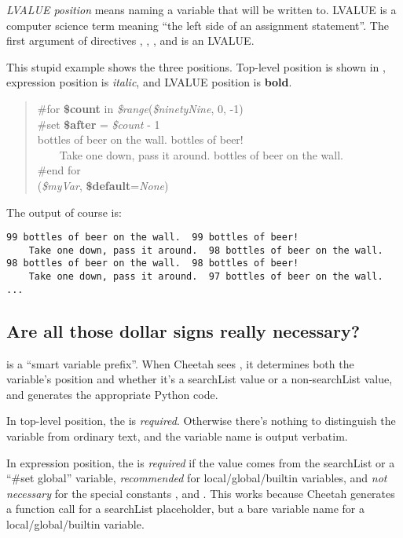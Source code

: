 {\em LVALUE position} means naming a variable that will be written to.  LVALUE
is a computer science term meaning ``the left side of an assignment 
statement''.  The first argument of directives , ,
,  and  is an LVALUE.

This stupid example shows the three positions.  Top-level position is shown
in , expression position is {\em italic}, and LVALUE position is
{\bf bold}.

\begin{quote}
\#for {\bf \$count} in {\em \$range}({\em \$ninetyNine}, 0, -1)\\
\#set {\bf \$after} = {\em \$count} - 1\\
 bottles of beer on the wall.   bottles of beer!\\
~~~~Take one down, pass it around.   bottles of beer on the wall.\\
\#end for\\
({\em \$myVar}, {\bf \$default}={\em None})
\end{quote}

The output of course is:
\begin{verbatim}
99 bottles of beer on the wall.  99 bottles of beer!
    Take one down, pass it around.  98 bottles of beer on the wall.
98 bottles of beer on the wall.  98 bottles of beer!
    Take one down, pass it around.  97 bottles of beer on the wall.
...
\end{verbatim}


\subsection{Are all those dollar signs really necessary?}
\label{language.placeholders.dollar-signs}

\code{\$} is a ``smart variable prefix''.  When Cheetah sees \code{\$}, it
determines both the variable's position and whether it's a searchList value or
a non-searchList value, and generates the appropriate Python code.  

In top-level position, the \code{\$} is {\em required}.  Otherwise there's
nothing to distinguish the variable from ordinary text, and the variable name
is output verbatim.

In expression position, the \code{\$} is {\em required} if the value comes from
the searchList or a ``\#set global'' variable, {\em recommended} for
local/global/builtin variables, and {\em not necessary} for the special
constants ,  and .  This works because
Cheetah generates a function call for a searchList placeholder, but a bare
variable name for a local/global/builtin variable.  


